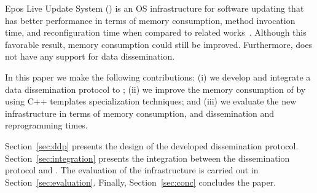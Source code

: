 Epos Live Update System (\ELUS{}) is an OS infrastructure for software updating that has better performance in terms of memory consumption, method invocation time, and reconfiguration time when compared to related works~\cite{Gracioli:2010}.
Although this favorable result, \ELUS{} memory consumption could still be improved.
Furthermore, \ELUS{} does not have any support for data dissemination. 


In this paper we make the following contributions: (i) we develop and integrate a data dissemination protocol to \ELUS{}; (ii) we improve the memory consumption of \ELUS{} by using C++ templates specialization techniques; and (iii) we evaluate the new infrastructure in terms of memory consumption, and dissemination and reprogramming times.

Section~\ref{sec:ddp} presents the design of the developed dissemination protocol.
Section~\ref{sec:integration} presents the integration between the dissemination protocol and \ELUS{}.
The evaluation of the infrastructure is carried out in Section~\ref{sec:evaluation}.
Finally, Section~\ref{sec:conc} concludes the paper.
